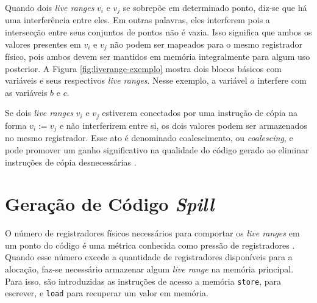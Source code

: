 \documentclass[
	12pt,				%
	openright,			%
	oneside,			%
	a4paper,			%
	tccpreliminar,			%
	]{ABNT-DC-UEL}
\begin{document}
Quando dois \textit{live ranges} $v_i$ e $v_j$ se sobrepõe em determinado ponto, diz-se que há uma interferência entre eles. Em outras palavras, eles interferem pois a intersecção entre seus conjuntos de pontos não é vazia. Isso significa que ambos os valores presentes em $v_i$ e $v_j$ não podem ser mapeados para o mesmo registrador físico, pois ambos devem ser mantidos em memória integralmente para algum uso posterior. A Figura \ref{fig:liverange-exemplo} mostra dois blocos básicos com variáveis e seus respectivos \textit{live ranges}. Nesse exemplo, a variável $a$ interfere com as variáveis $b$ e $c$.

Se dois \textit{live ranges} $v_i$ e $v_j$ estiverem conectados por uma instrução de cópia na forma $v_i := v_j$ e não interferirem entre si, os dois valores podem ser armazenados no mesmo registrador. Esse ato é denominado coalescimento, ou \textit{coalescing}, e pode promover um ganho significativo na qualidade do código gerado ao eliminar instruções de cópia desnecessárias \cite{appel:96, chaitin:82, briggs:92}.

\section{Geração de Código \textit{Spill}}

O número de registradores físicos necessários para comportar os \textit{live ranges} em um ponto do código é uma métrica conhecida como pressão de registradores \cite{braun:09}. Quando esse número excede a quantidade de registradores disponíveis para a alocação, faz-se necessário armazenar algum \textit{live range} na memória principal. Para isso, são introduzidas as instruções de acesso a memória \texttt{store}, para escrever, e \texttt{load} para recuperar um valor em memória. 
\end{document}
